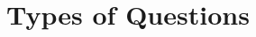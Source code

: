 \documentclass[runningheads,a4paper]{llncs}
\begin{document}






\section{Types of Questions}
\label{sec:questions}
\end{document}
